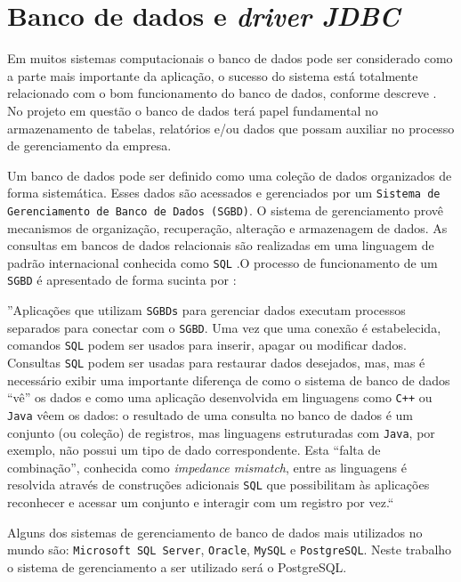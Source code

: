 \section{Banco de dados e \textit{driver JDBC}}

Em muitos sistemas computacionais o banco de dados pode ser considerado como a parte mais
importante da aplicação, o sucesso do sistema está totalmente relacionado com o bom
funcionamento do banco de dados, conforme descreve  \cite{marcilio2004}. No projeto em questão o banco de
dados terá papel fundamental no armazenamento de tabelas, relatórios e/ou dados que possam
auxiliar no processo de gerenciamento da empresa.

Um banco de dados pode ser definido como uma coleção de dados organizados de forma sistemática. Esses dados são acessados e gerenciados por
um \texttt{Sistema de Gerenciamento de Banco de Dados (SGBD)}. O sistema de gerenciamento provê mecanismos de organização, recuperação, 
alteração e armazenagem de dados. As consultas em bancos de dados relacionais são realizadas em uma linguagem de padrão internacional 
conhecida como \texttt{SQL} \cite{bdrelacional}.O processo de funcionamento de um \texttt{SGBD} é apresentado de forma sucinta por \cite[p.~2]{marcilio2004}:


\begin{citacao}
 
 ''Aplicações que utilizam \texttt{SGBDs} para gerenciar dados executam processos separados para conectar com o \texttt{SGBD}.
 Uma vez que uma conexão é estabelecida, comandos \texttt{SQL} podem ser usados para inserir, apagar ou modificar dados. 
 Consultas \texttt{SQL} podem ser usadas para restaurar dados desejados, mas, mas é necessário exibir uma importante diferença
 de como o sistema de banco de dados “vê” os dados e como uma aplicação desenvolvida em linguagens como \texttt{C++} ou \texttt{Java} vêem 
 os dados: o resultado de uma consulta no banco de dados é um conjunto (ou coleção) de registros, mas linguagens estruturadas 
 com \texttt{Java}, por exemplo, não possui um tipo de dado correspondente. Esta “falta de combinação”, conhecida como \textit{impedance mismatch}, 
 entre as linguagens é resolvida através de construções adicionais \texttt{SQL} que possibilitam às aplicações reconhecer e acessar um conjunto 
 e interagir com um registro por vez.``
  
 \end{citacao}

Alguns dos sistemas de gerenciamento de banco de dados mais utilizados no mundo são: \texttt{Microsoft SQL Server}, \texttt{Oracle}, \texttt{MySQL} e \texttt{PostgreSQL}.
Neste trabalho o sistema de gerenciamento a ser utilizado será o PostgreSQL.

